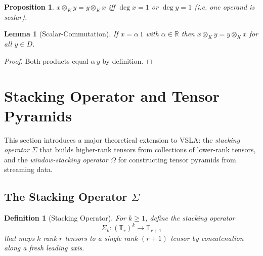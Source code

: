 \documentclass[11pt]{article}
\newtheorem{proposition}[theorem]{Proposition}
\newtheorem{lemma}[theorem]{Lemma}
\newtheorem{definition}[theorem]{Definition}
\begin{document}
\begin{proposition}\label{prop:commCase}
$x\otimes_K y = y\otimes_K x$ iff $\deg x =1$ or $\deg y =1$ (i.e. one operand is scalar).
\end{proposition}

\begin{lemma}[Scalar‑Commutation]\label{lem:scalarComm}
If $x=\alpha\,1$ with $\alpha\in\mathbb R$ then $x\otimes_K y = y\otimes_K x$ for all $y\in D$.
\end{lemma}
\begin{proof}
Both products equal $\alpha\,y$ by definition.\qedhere
\end{proof}

\section{Stacking Operator and Tensor Pyramids}
\label{sec:stacking}

This section introduces a major theoretical extension to VSLA: the \emph{stacking operator} $\Sigma$ that builds higher-rank tensors from collections of lower-rank tensors, and the \emph{window-stacking operator} $\Omega$ for constructing tensor pyramids from streaming data.

\subsection{The Stacking Operator $\Sigma$}

\begin{definition}[Stacking Operator]
\label{def:stacking}
For $k \geq 1$, define the stacking operator
\[
\Sigma_k : (\mathbb{T}_r)^k \longrightarrow \mathbb{T}_{r+1}
\]
that maps $k$ rank-$r$ tensors to a single rank-$(r+1)$ tensor by concatenation along a fresh leading axis.
\end{definition}
\end{document}
